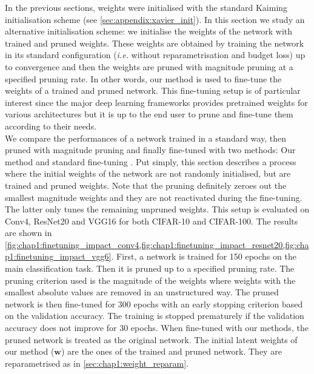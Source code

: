 In the previous sections, weights were initialised with the standard Kaiming
initialisation scheme \cite{DBLP:conf/iccv/HeZRS15} (see
\cref{sec:appendix:xavier_init}). In this section we study an alternative
initialisation scheme: we initialise the weights of the network with trained
and pruned weights. These weights are obtained by training the network in its
standard configuration (\emph{i.e.} without reparametrisation and budget loss)
up to convergence and then the weights are pruned with magnitude pruning at a
specified pruning rate. In other words, our method is used to fine-tune the
weights of a trained and pruned network. This fine-tuning setup is of particular
interest since the major deep learning frameworks
\cite{DBLP:conf/nips/PaszkeGMLBCKLGA19,DBLP:journals/corr/AbadiABBCCCDDDG16}
provides pretrained weights for various architectures \cite{pytorch_vision} but
it is up to the end user to prune and fine-tune them according to their needs.\\

We compare the performances of a network trained in a standard way, then pruned
with magnitude pruning and finally fine-tuned with two methods: Our method and
standard fine-tuning \cite{DBLP:conf/nips/HanPTD15}. Put simply, this section
describes a process where the initial weights of the network are not randomly
initialised, but are trained and pruned weights. Note that the pruning
definitely zeroes out the smallest magnitude weights and they are not
reactivated during the fine-tuning. The latter only tunes the remaining unpruned
weights. This setup is evaluated on Conv4, ResNet20 and VGG16 for both CIFAR-10
and CIFAR-100. The results are shown in
\cref{fig:chap1:finetuning_impact_conv4,fig:chap1:finetuning_impact_resnet20,fig:chap1:finetuning_impact_vgg6}.
First, a network is trained for 150 epochs on the main classification task. Then
it is pruned up to a specified pruning rate. The pruning criterion used is the
magnitude of the weights where weights with the smallest absolute values are
removed in an unstructured way. The pruned network is then fine-tuned for 300
epochs with an early stopping criterion based on the validation accuracy. The
training is stopped prematurely if the validation accuracy does not improve for
30 epochs. When fine-tuned with our methods, the pruned network is treated as
the original network. The initial latent weights of our method ($\mathbf{w}$)
are the ones of the trained and pruned network. They are reparametrised as in
\ref{sec:chap1:weight_reparam}.\\


